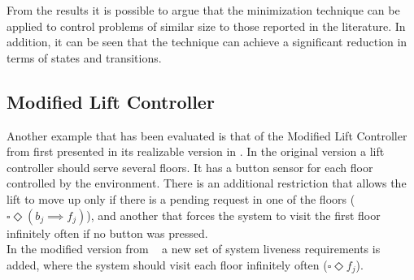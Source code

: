 From the results it is possible to argue that the minimization technique can be applied to control problems of similar size to those reported in the literature. 
In addition, it can be seen that the technique can achieve a significant reduction in terms of states and transitions.



\subsection{Modified Lift Controller}
Another example that has been evaluated is that
of the Modified Lift Controller from 
\cite{DBLP:conf/fmcad/AlurMT13} first presented in
its realizable version in 
\cite{DBLP:journals/jcss/BloemJPPS12}.
In the original version a lift controller should serve
several floors.  It has a button sensor for each floor 
controlled by the environment.  There is an additional 
restriction that allows the lift to move up only if there
is a pending request in one of the floors 
($\square \Diamond (b_j \implies f_j)$), and another that
forces the system to visit the first floor infinitely
often if no button was pressed.\\
In the modified version from ~\cite{DBLP:conf/fmcad/AlurMT13} a new set of system liveness 
requirements is added, where the system should 
visit each floor infinitely often ($\square \Diamond f_j$).


